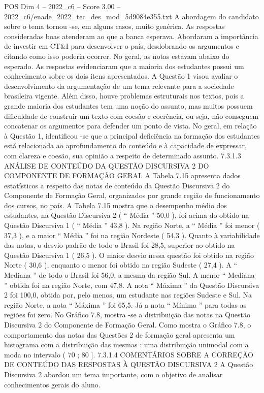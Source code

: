 \begin{textsample}{POS Dim 4 – 2022\_c6 – Score 3.00 – 2022\_c6/enade\_2022\_tec\_des\_mod\_5d9084e355.txt}
A abordagem do candidato sobre o tema tornou -se, em alguns casos, muito genérica.
As respostas consideradas boas atenderam ao que a banca esperava.
Abordaram a importância de investir em CT\&I para desenvolver o país, desdobrando os argumentos e citando como isso poderia ocorrer.
No geral, as notas estavam abaixo do esperado.
As respostas evidenciaram que a maioria dos estudantes possui um conhecimento sobre os dois itens apresentados.
A Questão 1 visou avaliar o desenvolvimento da argumentação de um tema relevante para a sociedade brasileira vigente.
Além disso, houve problemas estruturais nos textos, pois a grande maioria dos estudantes tem uma noção do assunto, mas muitos possuem dificuldade de construir um texto com coesão e coerência, ou seja, não conseguem concatenar os argumentos para defender um ponto de vista.
No geral, em relação à Questão 1, identificou -se que a principal deficiência na formação dos estudantes está relacionada ao aprofundamento do conteúdo e à capacidade de expressar, com clareza e coesão, sua opinião a respeito de determinado assunto. 7.3.1.3 ANÁLISE DE CONTEÚDO DA QUESTÃO DISCURSIVA 2 DO COMPONENTE DE FORMAÇÃO GERAL A Tabela 7.15 apresenta dados estatísticos a respeito das notas de conteúdo da Questão Discursiva 2 do Componente de Formação Geral, organizados por grande região de funcionamento dos cursos, no país.
A Tabela 7.15 mostra que o desempenho médio dos estudantes, na Questão Discursiva 2 ( “ Média ” 50,0 ), foi acima do obtido na Questão Discursiva 1 ( “ Média ” 43,8 ).
Na região Norte, a “ Média ” foi menor ( 37,3 ), e a maior “ Média ” foi na região Nordeste ( 54,3 ).
Quanto à variabilidade das notas, o desvio-padrão de todo o Brasil foi 28,5, superior ao obtido na Questão Discursiva 1 ( 26,5 ).
O maior desvio nessa questão foi obtido na região Norte ( 30,6 ), enquanto o menor foi obtido na região Sudeste ( 27,4 ).
A “ Mediana ” de todo o Brasil foi 56,0, a mesma da região Sul.
A menor “ Mediana ” obtida foi na região Norte, com 47,8.
A nota “ Máxima ” da Questão Discursiva 2 foi 100,0, obtida por, pelo menos, um estudante nas regiões Sudeste e Sul.
Na região Norte, a nota “ Máxima ” foi 65,5.
Já a nota “ Mínima ” para todas as regiões foi zero.
No Gráfico 7.8, mostra -se a distribuição das notas na Questão Discursiva 2 do Componente de Formação Geral.
Como mostra o Gráfico 7.8, o comportamento das notas das Questões 2 de formação geral apresenta um histograma com a distribuição das mesmas : uma distribuição unimodal com a moda no intervalo ( 70 ; 80 ]. 7.3.1.4 COMENTÁRIOS SOBRE A CORREÇÃO DE CONTEÚDO DAS RESPOSTAS À QUESTÃO DISCURSIVA 2 A Questão Discursiva 2 abordou um tema importante, com o objetivo de analisar conhecimentos gerais do aluno.

\end{textsample}
